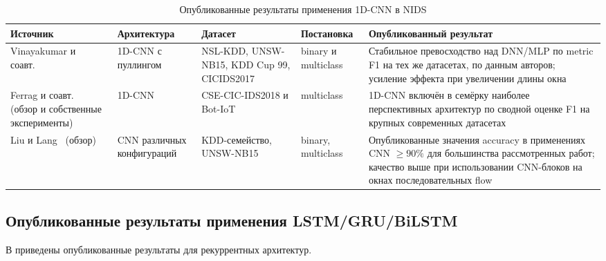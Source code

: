 \begin{table}[H]
\centering
\caption{Опубликованные результаты применения 1D-CNN в NIDS}
\label{tab:cnn-results}
\renewcommand{\arraystretch}{1.25}
\setlength{\tabcolsep}{4pt}
\small
\begin{tabularx}{\linewidth}{@{}lXlXX@{}}
\toprule
\textbf{Источник} & \textbf{Архитектура} & \textbf{Датасет} &
\textbf{Постановка} & \textbf{Опубликованный результат} \\
\midrule
Vinayakumar и соавт.~\cite{vinayakumar2019dl} &
1D-CNN с пуллингом &
NSL-KDD, UNSW-NB15, KDD Cup 99, CICIDS2017 &
binary и multiclass &
Стабильное превосходство над DNN/MLP по metric F1 на тех же датасетах,
по данным авторов; усиление эффекта при увеличении длины окна \\
\addlinespace
Ferrag и соавт.~\cite{ferrag2020dlcyber} (обзор и собственные эксперименты) &
1D-CNN &
CSE-CIC-IDS2018 и Bot-IoT &
multiclass &
1D-CNN включён в семёрку наиболее перспективных архитектур по сводной
оценке F1 на крупных современных датасетах \\
\addlinespace
Liu и Lang~\cite{liu2019survey} (обзор) &
CNN различных конфигураций &
KDD-семейство, UNSW-NB15 &
binary, multiclass &
Опубликованные значения accuracy в применениях CNN $\geq 90\%$ для большинства
рассмотренных работ; качество выше при использовании CNN-блоков на окнах
последовательных flow \\
\bottomrule
\end{tabularx}
\end{table}

\subsection{Опубликованные результаты применения LSTM/GRU/BiLSTM}

В  приведены опубликованные результаты для
рекуррентных архитектур.

